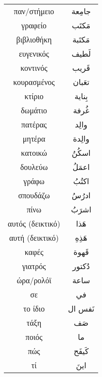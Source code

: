 \documentclass[twocolumn,a4paper]{article}
\newcommand{\ar}[1]{\textarabic{#1}}
\begin{document}
\begin{supertabular}{ c c }
παν/στήμειο & \ar{ جامِعة } \\
γραφείο     & \ar{ مَكتَب } \\
βιβλιοθήκη  & \ar{ مَكتَبة } \\
ευγενικός   & \ar{ لَطيف } \\
κοντινός    & \ar{ قَريب } \\
κουρασμένος & \ar{ تعَبان } \\
κτίριο      & \ar{ بِناية } \\
δωμάτιο     & \ar{ غُرفة } \\
πατέρας     & \ar{ والِد} \\
μητέρα      & \ar{ والِدة } \\
κατοικώ     & \ar{ اسكُنُ } \\
δουλεύω     & \ar{ اعمَلُ } \\
γράφω       & \ar{ اكتُبُ } \\
σπουδάζω    & \ar{ ادرُسُ } \\
πίνω        & \ar{ اشرَبُ } \\
αυτός (δεικτικό) & \ar{ هَذا } \\
αυτή (δεικτικό)  & \ar{ هَذِهِ } \\
καφές       & \ar{ قَهوة } \\
γιατρός     & \ar{ دُكتور } \\
ώρα/ρολόϊ   & \ar{ ساعة} \\
σε          & \ar{ في } \\
το ίδιο     & \ar{ نَفس ال } \\
τάξη        & \ar{ صَف } \\
ποιός       & \ar{ ما } \\
πώς         & \ar{ كَيفَح } \\
τί          & \ar{ اينَ } \\

\end{supertabular}


\clearpage
\end{document}
